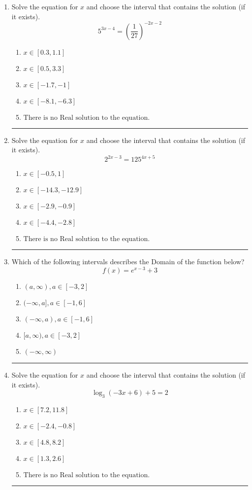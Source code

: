 \documentclass[14pt]{extbook}
\newcommand{\litem}[1]{\item#1\hspace*{-1cm}\rule{\textwidth}{0.4pt}}
\begin{document}
\begin{enumerate}
{\begin{enumerate}[label=\Alph*.]
\end{enumerate} }
\litem{
Solve the equation for $x$ and choose the interval that contains the solution (if it exists).\[ 5^{3x-4} = \left(\frac{1}{27}\right)^{-2x-2} \]\begin{enumerate}[label=\Alph*.]
\item \( x \in [0.3, 1.1] \)
\item \( x \in [0.5, 3.3] \)
\item \( x \in [-1.7, -1] \)
\item \( x \in [-8.1, -6.3] \)
\item \( \text{There is no Real solution to the equation.} \)

\end{enumerate} }
\litem{
Solve the equation for $x$ and choose the interval that contains the solution (if it exists).\[ 2^{2x-3} = 125^{4x+5} \]\begin{enumerate}[label=\Alph*.]
\item \( x \in [-0.5, 1] \)
\item \( x \in [-14.3, -12.9] \)
\item \( x \in [-2.9, -0.9] \)
\item \( x \in [-4.4, -2.8] \)
\item \( \text{There is no Real solution to the equation.} \)

\end{enumerate} }
\litem{
Which of the following intervals describes the Domain of the function below?\[ f(x) = e^{x-3}+3 \]\begin{enumerate}[label=\Alph*.]
\item \( (a, \infty), a \in [-3, 2] \)
\item \( (-\infty, a], a \in [-1, 6] \)
\item \( (-\infty, a), a \in [-1, 6] \)
\item \( [a, \infty), a \in [-3, 2] \)
\item \( (-\infty, \infty) \)

\end{enumerate} }
\litem{
Solve the equation for $x$ and choose the interval that contains the solution (if it exists).\[ \log_{3}{(-3x+6)}+5 = 2 \]\begin{enumerate}[label=\Alph*.]
\item \( x \in [7.2, 11.8] \)
\item \( x \in [-2.4, -0.8] \)
\item \( x \in [4.8, 8.2] \)
\item \( x \in [1.3, 2.6] \)
\item \( \text{There is no Real solution to the equation.} \)


\end{enumerate}}
\end{enumerate}
\end{document}
